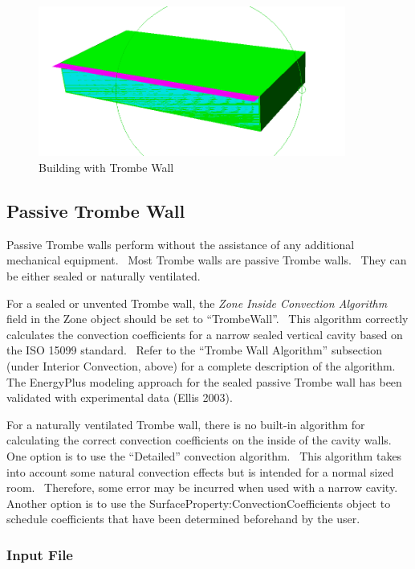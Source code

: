 \begin{figure}[hbtp] %
\centering
\includegraphics[width=0.9\textwidth, height=0.9\textheight, keepaspectratio=true]{media/image6830.png}
\caption{Building with Trombe Wall \protect \label{fig:building-with-trombe-wall}}
\end{figure}

\subsection{Passive Trombe Wall}\label{passive-trombe-wall}

Passive Trombe walls perform without the assistance of any additional mechanical equipment.~ Most Trombe walls are passive Trombe walls.~ They can be either sealed or naturally ventilated.

For a sealed or unvented Trombe wall, the \emph{Zone Inside Convection Algorithm} field in the Zone object should be set to ``TrombeWall''.~ This algorithm correctly calculates the convection coefficients for a narrow sealed vertical cavity based on the ISO 15099 standard.~ Refer to the ``Trombe Wall Algorithm'' subsection (under Interior Convection, above) for a complete description of the algorithm.~ The EnergyPlus modeling approach for the sealed passive Trombe wall has been validated with experimental data (Ellis 2003).

For a naturally ventilated Trombe wall, there is no built-in algorithm for calculating the correct convection coefficients on the inside of the cavity walls.~ One option is to use the ``Detailed'' convection algorithm.~ This algorithm takes into account some natural convection effects but is intended for a normal sized room.~ Therefore, some error may be incurred when used with a narrow cavity.~ Another option is to use the SurfaceProperty:ConvectionCoefficients object to schedule coefficients that have been determined beforehand by the user.

\subsubsection{Input File}\label{input-file}

